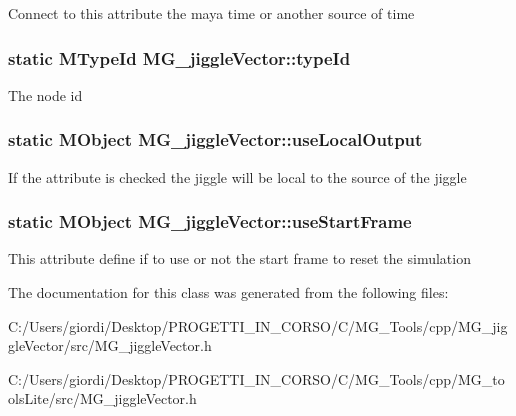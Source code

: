 Connect to this attribute the maya time or another source of time \hypertarget{class_m_g__jiggle_vector_a5b2ebd5c51fb61ac246737c2871da7e7}{
\subsubsection[{type\-Id}]{\setlength{\rightskip}{0pt plus 5cm}static M\-Type\-Id M\-G\-\_\-jiggle\-Vector\-::type\-Id\hspace{0.3cm}{\ttfamily [static]}}}\label{class_m_g__jiggle_vector_a5b2ebd5c51fb61ac246737c2871da7e7}
The node id \hypertarget{class_m_g__jiggle_vector_ad81b7cebe25d1b1f6c4ef1d234233015}{
\subsubsection[{use\-Local\-Output}]{\setlength{\rightskip}{0pt plus 5cm}static M\-Object M\-G\-\_\-jiggle\-Vector\-::use\-Local\-Output\hspace{0.3cm}{\ttfamily [static]}}}\label{class_m_g__jiggle_vector_ad81b7cebe25d1b1f6c4ef1d234233015}
If the attribute is checked the jiggle will be local to the source of the jiggle \hypertarget{class_m_g__jiggle_vector_a680e0c72b6b00e9f828e441302753058}{
\subsubsection[{use\-Start\-Frame}]{\setlength{\rightskip}{0pt plus 5cm}static M\-Object M\-G\-\_\-jiggle\-Vector\-::use\-Start\-Frame\hspace{0.3cm}{\ttfamily [static]}}}\label{class_m_g__jiggle_vector_a680e0c72b6b00e9f828e441302753058}
This attribute define if to use or not the start frame to reset the simulation 

The documentation for this class was generated from the following files\-:\begin{DoxyCompactItemize}
\item 
C\-:/\-Users/giordi/\-Desktop/\-P\-R\-O\-G\-E\-T\-T\-I\-\_\-\-I\-N\-\_\-\-C\-O\-R\-S\-O/\-C/\-M\-G\-\_\-\-Tools/cpp/\-M\-G\-\_\-jiggle\-Vector/src/M\-G\-\_\-jiggle\-Vector.\-h\item 
C\-:/\-Users/giordi/\-Desktop/\-P\-R\-O\-G\-E\-T\-T\-I\-\_\-\-I\-N\-\_\-\-C\-O\-R\-S\-O/\-C/\-M\-G\-\_\-\-Tools/cpp/\-M\-G\-\_\-tools\-Lite/src/M\-G\-\_\-jiggle\-Vector.\-h\end{DoxyCompactItemize}
